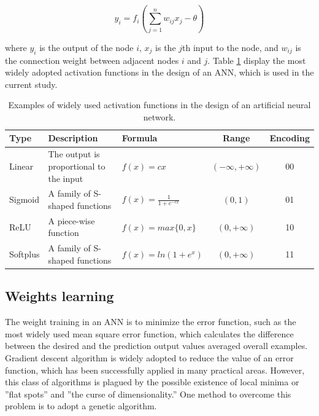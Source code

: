 \documentclass[letterpaper]{IEEEtran}
\begin{document}
\begin{equation}
	y_i = f_i(\sum_{j=1}^n{w_{ij}x_j - \theta})
\end{equation}

where $y_i$ is the output of the node $i$, $x_j$ is the $j$th input to the
node, and $w_{ij}$ is the connection weight between adjacent nodes $i$ and $j$.
Table \ref{tab:transfer_function} display the most widely adopted activation
functions in the design of an ANN, which is used in the current study.

\begin{table}[!b]
\centering
\caption{Examples of widely used activation functions in the design of an artificial neural network.}
\label{tab:active_function}
\begin{adjustbox}{width=0.5\textwidth}
\label{tab:transfer_function}
	\begin{tabular}{lllcc}
			\toprule
			Type & Description  & Formula & Range              & Encoding\\
			\midrule
			Linear   & The output is proportional to the input & $f(x)=cx$                  &  $(-\infty, +\infty)$ & 00\\
			Sigmoid  & A family of S-shaped functions          & $f(x)=\frac{1}{1+e^{-cx}}$ & $(0, 1)$              & 01\\
			ReLU     & A piece-wise function                   & $f(x)= max\{0,x\}$           & $(0, +\infty)$        & 10\\
			Softplus & A family of S-shaped functions          & $f(x) = ln(1+e^x)$         & $(0, +\infty)$        & 11\\
			\bottomrule
	\end{tabular}
\end{adjustbox}
\end{table}

\subsection{Weights learning}
The weight training in an ANN is to minimize the error function, such as the
most widely used mean square error function, which calculates the difference
between the desired and the prediction output values averaged overall examples.
Gradient descent algorithm is widely adopted to reduce the value of an error
function, which has been successfully applied in many practical areas. However,
this class of algorithms is plagued by the possible existence of local minima
or ”flat spots” and ”the curse of dimensionality.” One method to overcome this
problem is to adopt a genetic algorithm.
\end{document}
